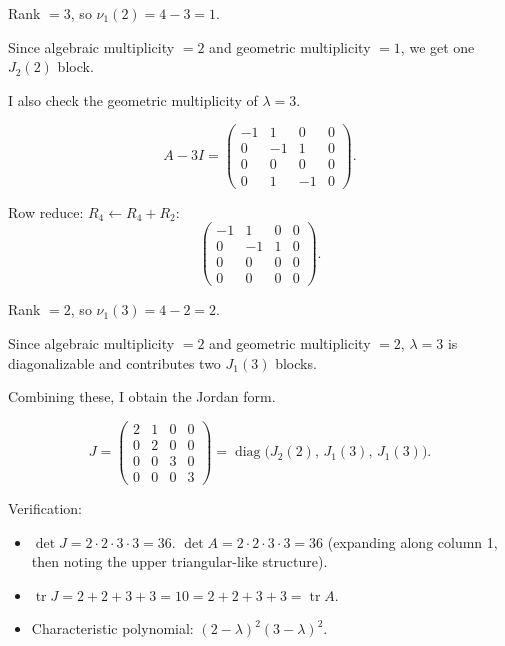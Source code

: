 \documentclass{article}
\begin{document}
\begin{mdframed}[linewidth=1pt]
Rank $= 3$, so $\nu_1(2) = 4 - 3 = 1$.

Since algebraic multiplicity $= 2$ and geometric multiplicity $= 1$, we get one $J_2(2)$ block.

\medskip
\textnormal{I also check the geometric multiplicity of $\lambda = 3$.}

\[
A - 3I = \begin{pmatrix} -1 & 1 & 0 & 0 \\ 0 & -1 & 1 & 0 \\ 0 & 0 & 0 & 0 \\ 0 & 1 & -1 & 0 \end{pmatrix}.
\]

Row reduce: $R_4 \leftarrow R_4 + R_2$:
\[
\begin{pmatrix} -1 & 1 & 0 & 0 \\ 0 & -1 & 1 & 0 \\ 0 & 0 & 0 & 0 \\ 0 & 0 & 0 & 0 \end{pmatrix}.
\]

Rank $= 2$, so $\nu_1(3) = 4 - 2 = 2$.

Since algebraic multiplicity $= 2$ and geometric multiplicity $= 2$, $\lambda = 3$ is diagonalizable and contributes two $J_1(3)$ blocks.

\medskip
\textnormal{Combining these, I obtain the Jordan form.}

\[
\boxed{J = \begin{pmatrix} 2 & 1 & 0 & 0 \\ 0 & 2 & 0 & 0 \\ 0 & 0 & 3 & 0 \\ 0 & 0 & 0 & 3 \end{pmatrix} = \operatorname{diag}\bigl(J_2(2),\, J_1(3),\, J_1(3)\bigr).}
\]

\medskip
\textnormal{Verification:}
\begin{itemize}
    \item $\det J = 2 \cdot 2 \cdot 3 \cdot 3 = 36$. $\det A = 2 \cdot 2 \cdot 3 \cdot 3 = 36$ (expanding along column 1, then noting the upper triangular-like structure).    \item $\operatorname{tr} J = 2 + 2 + 3 + 3 = 10 = 2 + 2 + 3 + 3 = \operatorname{tr} A$.    \item Characteristic polynomial: $(2-\lambda)^2(3-\lambda)^2$.\end{itemize}
\end{mdframed}
\end{document}
